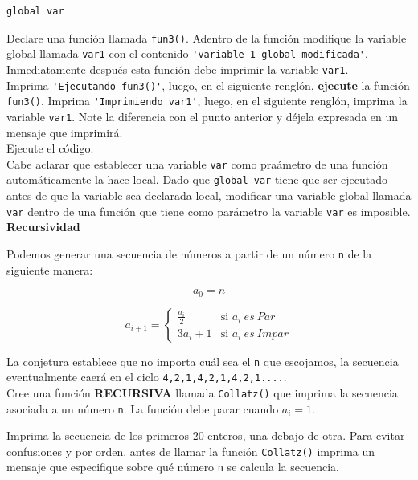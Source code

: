 \documentclass[11pt,letterpaper]{exam}
\begin{document}
\begin{questions}
\begin{verbatim}
global var
\end{verbatim}

Declare una funci\'on llamada \verb"fun3()". Adentro de la funci\'on modifique la variable global llamada \verb"var1" con el contenido \verb"'variable 1 global modificada'". Inmediatamente despu\'es esta funci\'on debe imprimir la variable \verb"var1".\\  

Imprima \verb"'Ejecutando fun3()'", luego, en el siguiente rengl\'on, \textbf{ejecute} la funci\'on \verb"fun3()". Imprima \verb"'Imprimiendo var1'", luego, en el siguiente rengl\'on, imprima la variable \verb"var1". Note la diferencia con el punto anterior y d\'ejela expresada en un mensaje que imprimir\'a.\\

Ejecute el c\'odigo.\\

Cabe aclarar que establecer una variable \verb"var" como pra\'ametro de una funci\'on autom\'aticamente la hace local. Dado que \verb"global var" tiene que ser ejecutado antes de que la variable sea declarada local, modificar una variable global llamada \verb"var" dentro de una funci\'on que tiene como par\'ametro la variable \verb"var" es imposible.\\

\LARGE \textbf{Recursividad}\\

\normalsize



Podemos generar una secuencia de n\'umeros a partir de un n\'umero \verb"n" de la siguiente manera:

\begin{equation*}
a_0 = n
\end{equation*}


\begin{equation*}
a_{i+1} =
\left\{
	\begin{array}{ll}
		\frac{a_i}{2}  & \mbox{si } a_i\ es\ Par \\
		3a_i+1 & \mbox{si } a_i\ es\ Impar
	\end{array}
\right.
\end{equation*}

La conjetura establece que no importa cu\'al sea el \verb"n" que escojamos, la secuencia eventualmente caer\'a en el ciclo \verb"4,2,1,4,2,1,4,2,1....".\\

Cree una funci\'on \textbf{RECURSIVA} llamada \verb"Collatz()" que imprima la secuencia asociada a un n\'umero \verb"n". La funci\'on debe parar cuando $a_i=1$. \\


Imprima la secuencia de los primeros $20$ enteros, una debajo de otra. Para evitar confusiones y por orden, antes de llamar la funci\'on \verb"Collatz()" imprima un mensaje que especifique sobre qu\'e n\'umero \verb"n" se calcula la secuencia.\\

\end{questions}
\end{document}
